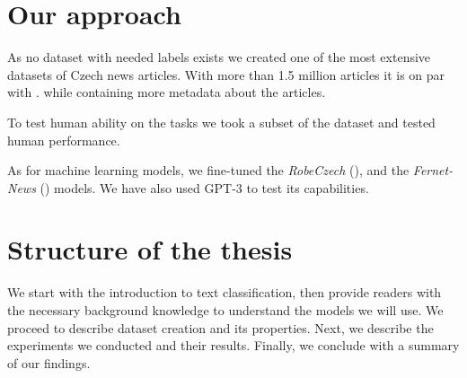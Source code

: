 \section*{Our approach}
As no dataset with needed labels exists we created one of the most extensive datasets of Czech news articles. 
With more than 1.5 million articles it is on par with \cite{sidoCzertCzechBERTlike2021}.
while containing more metadata about the articles.

To test human ability on the tasks we took a subset of the dataset and tested human performance.

As for machine learning models, we fine-tuned the \textit{RobeCzech} (\cite{strakaRobeCzechCzechRoBERTa2021}),
and the \textit{Fernet-News} (\cite{leheckaComparisonCzechTransformers2021}) models. 
We have also used GPT-3 \cite{brownLanguageModelsAre2020b} to test its capabilities.

\section*{Structure of the thesis}
We start with the introduction to text classification, then provide readers with the necessary background knowledge
to understand the models we will use. We proceed to describe dataset creation and its properties.
Next, we describe the experiments we conducted and their results. Finally, we conclude with a summary of our findings.